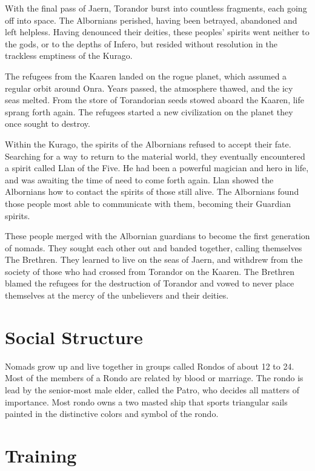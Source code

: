 With the final pass of Jaern, Torandor burst into countless fragments, each going off into space. The Albornians perished, having been betrayed, abandoned and left helpless. Having denounced their deities, these peoples' spirits went neither to the gods, or to the depths of Infero, but resided without resolution in the trackless emptiness of the Kurago.

The refugees from the Kaaren landed on the rogue planet, which assumed a regular orbit around Onra. Years passed, the atmosphere thawed, and the icy seas melted. From the store of Torandorian seeds stowed aboard the Kaaren, life sprang forth again. The refugees started a new civilization on the planet they once sought to destroy.

Within the Kurago, the spirits of the Albornians refused to accept their fate. Searching for a way to return to the material world, they eventually encountered a spirit called Llan of the Five. He had been a powerful magician and hero in life, and was awaiting the time of need to come forth again. Llan showed the Albornians how to contact the spirits of those still alive. The Albornians found those people most able to communicate with them, becoming their Guardian spirits.

These people merged with the Albornian guardians to become the first generation of nomads. They sought each other out and banded together, calling themselves The Brethren. They learned to live on the seas of Jaern, and withdrew from the society of those who had crossed from Torandor on the Kaaren. The Brethren blamed the refugees for the destruction of Torandor and vowed to never place themselves at the mercy of the unbelievers and their deities.

\section{Social Structure}

Nomads grow up and live together in groups called Rondos of about 12 to 24. Most of the members of a Rondo are related by blood or marriage. The rondo is lead by the senior-most male elder, called the Patro, who decides all matters of importance. Most rondo owns a two masted ship that sports triangular sails painted in the distinctive colors and symbol of the rondo.

\section{Training}

